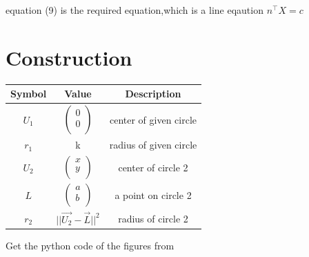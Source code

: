 \documentclass[journal,12pt,twocolumn]{IEEEtran}
\begin{document}
\unboldmath 

equation (9) is the required equation,which is a line eqaution
\boldmath
${n}^{\top}X=c$
\unboldmath

\section*{Construction}
\centering
\vspace{0.2cm}
{
\setlength\extrarowheight{2pt}
\begin{tabular}{|c|c|c|}
	\hline
	\textbf{Symbol}&\textbf{Value}&\textbf{Description}\\
	\hline
	$U_1$ & $\begin{pmatrix}0 \\ 0 \\ \end{pmatrix}$ & center of given circle\\
	\hline
	$r_1$ & k & radius of given circle\\
	\hline
	$U_2$ & $\begin{pmatrix}x \\ y \\ \end{pmatrix}$ & center of circle 2\\
	\hline
	$L$ & $\begin{pmatrix}a \\ b \\ \end{pmatrix}$ & a point on  circle 2\\
	\hline
	$r_2$ & $||{\vec{U_2}-\vec{L}}||^2$ & radius of circle 2\\
	\hline
\end{tabular}
}

\vspace{3cm}
Get the python code of the figures from
\begin{table}[h]
\large
\centering
{}

\end{table}
\end{document}
